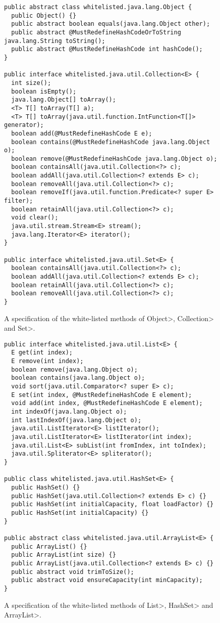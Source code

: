 \begin{figure}[t]
{\scriptsize\begin{verbatim}
public abstract class whitelisted.java.lang.Object {
  public Object() {}
  public abstract boolean equals(java.lang.Object other);
  public abstract @MustRedefineHashCodeOrToString java.lang.String toString();
  public abstract @MustRedefineHashCode int hashCode();
}

public interface whitelisted.java.util.Collection<E> {
  int size();
  boolean isEmpty();
  java.lang.Object[] toArray();
  <T> T[] toArray(T[] a);
  <T> T[] toArray(java.util.function.IntFunction<T[]> generator);
  boolean add(@MustRedefineHashCode E e);
  boolean contains(@MustRedefineHashCode java.lang.Object o);
  boolean remove(@MustRedefineHashCode java.lang.Object o);
  boolean containsAll(java.util.Collection<?> c);
  boolean addAll(java.util.Collection<? extends E> c);
  boolean removeAll(java.util.Collection<?> c);
  boolean removeIf(java.util.function.Predicate<? super E> filter);
  boolean retainAll(java.util.Collection<?> c);
  void clear();
  java.util.stream.Stream<E> stream();
  java.lang.Iterator<E> iterator();
}

public interface whitelisted.java.util.Set<E> {
  boolean containsAll(java.util.Collection<?> c);
  boolean addAll(java.util.Collection<? extends E> c);
  boolean retainAll(java.util.Collection<?> c);
  boolean removeAll(java.util.Collection<?> c);
}
\end{verbatim}}
\caption{A specification of the white-listed methods of \<Object>, \<Collection> and \<Set>.}
\label{fig:white_listed_Object_Collection_Set}
\end{figure}

\begin{figure}[t]
{\scriptsize\begin{verbatim}
public interface whitelisted.java.util.List<E> {
  E get(int index);
  E remove(int index);
  boolean remove(java.lang.Object o);
  boolean contains(java.lang.Object o);
  void sort(java.util.Comparator<? super E> c);
  E set(int index, @MustRedefineHashCode E element);
  void add(int index, @MustRedefineHashCode E element);
  int indexOf(java.lang.Object o);
  int lastIndexOf(java.lang.Object o);
  java.util.ListIterator<E> listIterator();
  java.util.ListIterator<E> listIterator(int index);
  java.util.List<E> subList(int fromIndex, int toIndex);
  java.util.Spliterator<E> spliterator();
}

public class whitelisted.java.util.HashSet<E> {
  public HashSet() {}
  public HashSet(java.util.Collection<? extends E> c) {}
  public HashSet(int initialCapacity, float loadFactor) {}
  public HashSet(int initialCapacity) {}
}

public abstract class whitelisted.java.util.ArrayList<E> {
  public ArrayList() {}
  public ArrayList(int size) {}
  public ArrayList(java.util.Collection<? extends E> c) {}
  public abstract void trimToSize();
  public abstract void ensureCapacity(int minCapacity);
}
\end{verbatim}}
\caption{A specification of the white-listed methods of \<List>, \<HashSet> and \<ArrayList>.}
\label{fig:white_listed_List_HashSet_ArrayList}
\end{figure}

